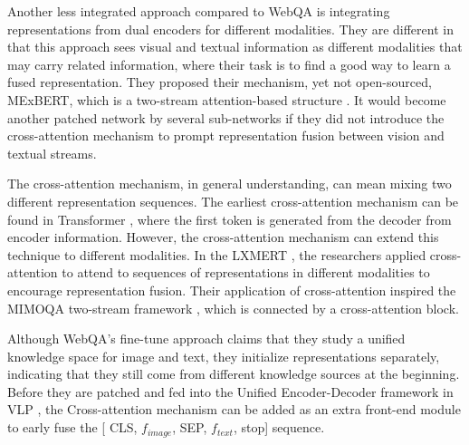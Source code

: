 \documentclass[nohyperref]{article}
\theoremstyle{plain}
\theoremstyle{definition}
\theoremstyle{remark}
\begin{document}
    Another less integrated approach compared to WebQA is integrating representations from dual encoders for different modalities. They are different in that this approach sees visual and textual information as different modalities that may carry related information, where their task is to find a good way to learn a fused representation. They proposed their mechanism, yet not open-sourced, MExBERT, which is a two-stream attention-based structure \cite{singh-etal-2021-mimoqa}. It would become another patched network by several sub-networks if they did not introduce the cross-attention mechanism to prompt representation fusion between vision and textual streams.

    The cross-attention mechanism, in general understanding, can mean mixing two different representation sequences. The earliest cross-attention mechanism can be found in Transformer \cite{transformer}, where the first token is generated from the decoder from encoder information. However, the cross-attention mechanism can extend this technique to different modalities. In the LXMERT \cite{lxmert}, the researchers applied cross-attention to attend to sequences of representations in different modalities to encourage representation fusion. Their application of cross-attention inspired the MIMOQA two-stream framework \cite{singh-etal-2021-mimoqa}, which is connected by a cross-attention block.

    Although WebQA’s fine-tune approach claims that they study a unified knowledge space for image and text, they initialize representations separately, indicating that they still come from different knowledge sources at the beginning. Before they are patched and fed into the Unified Encoder-Decoder framework in VLP \cite{vlp}, the Cross-attention mechanism can be added as an extra front-end module to early fuse the [\textlangle
    CLS\textrangle, \textlangle $f_{image}$\textrangle, \textlangle SEP\textrangle, \textlangle $f_{text}$\textrangle, \textlangle stop\textrangle] sequence.

    \clearpage

    
    
\end{document}
